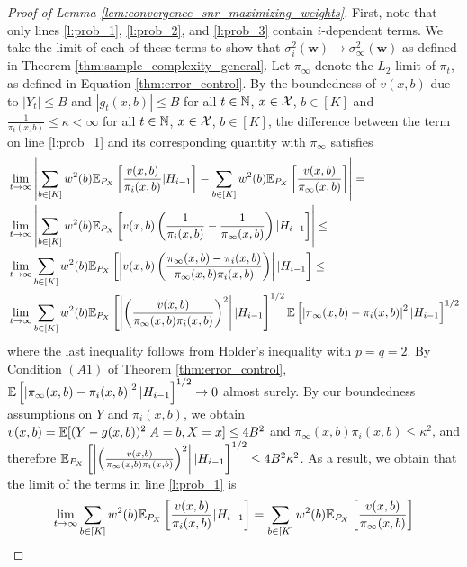 \documentclass{article}
\begin{document}
\begin{appendices}
\begin{proof}[Proof of Lemma \ref{lem:convergence_snr_maximizing_weights}]
First, note that only lines \eqref{l:prob_1}, \eqref{l:prob_2}, and \eqref{l:prob_3} contain $i$-dependent terms. We take the limit of each of these terms to show that $\sigma_i^2(\bm{w}) \rightarrow \sigma^2_\infty(\bm{w})$ as defined in Theorem \ref{thm:sample_complexity_general}. Let $\pi_\infty$ denote the $L_2$ limit of $\pi_t$, as defined in Equation \ref{thm:error_control}. By the boundedness of $v(x,b)$ due to $|Y_t| \leq B$ and $|g_t(x,b)| \leq B$ for all $t \in \mathbb{N}$, $x \in \mathcal{X}$, $b \in [K]$ and $\frac{1}{\pi_t(x,b)} \leq \kappa < \infty$ for all $t \in \mathbb{N}$, $x \in \mathcal{X}$, $b \in [K]$, the difference between the term on line \eqref{l:prob_1} and its corresponding quantity with $\pi_\infty$ satisfies
\begin{align}
    &\lim_{t \rightarrow \infty}\left|\sum_{b \in [K]}w^2(b) \mathbb{E}_{P_X}\left[\frac{v(x,b)}{\pi_i(x,b)} | H_{i-1}\right] - \sum_{b \in [K]}w^2(b) \mathbb{E}_{P_X}\left[\frac{v(x,b)}{\pi_\infty(x,b)}\right] \right| = \\
    & \lim_{t \rightarrow \infty} \left|\sum_{b \in [K]}w^2(b) \mathbb{E}_{P_X}\left[v(x,b)\left(\frac{1}{\pi_i(x,b)}- \frac{1}{\pi_\infty(x,b)}\right) | H_{i-1}\right] \right| \leq  \\
    & \lim_{t \rightarrow \infty}\sum_{b \in [K]}w^2(b) \mathbb{E}_{P_X}\left[ \left|v(x,b)\left(\frac{\pi_\infty(x,b) - \pi_i(x,b)}{\pi_\infty(x,b)\pi_i(x,b)}\right)\right| | H_{i-1}\right] \leq \\
    & \lim_{t \rightarrow \infty}\sum_{b \in [K]}w^2(b) \mathbb{E}_{P_X}\left[ \left|\left(\frac{v(x,b)}{\pi_\infty(x,b)\pi_i(x,b)}\right)^2\right| | H_{i-1}\right]^{1/2}\mathbb{E}\left[\left|\pi_\infty(x,b) - \pi_i(x,b)\right|^2|H_{i-1}\right]^{1/2}
\end{align}
where the last inequality follows from Holder's inequality with $p=q=2$. 
By Condition $(A1)$ of Theorem \ref{thm:error_control}, $\mathbb{E}\left[\left|\pi_\infty(x,b) - \pi_i(x,b)\right|^2|H_{i-1}\right]^{1/2} \rightarrow 0$ almost surely. By our boundedness assumptions on $Y$ and $\pi_i(x,b)$, we obtain $v(x,b) = \mathbb{E}[ (Y - g(x,b))^2 | A=b, X=x ] \leq 4B^2$ and $\pi_\infty(x,b)\pi_i(x,b)\leq \kappa^2$, and therefore $\mathbb{E}_{P_X}\left[ \left|\left(\frac{v(x,b)}{\pi_\infty(x,b)\pi_i(x,b)}\right)^2\right| | H_{i-1}\right]^{1/2} \leq 4B^2\kappa^2$. As a result, we obtain that the limit of the terms in line \eqref{l:prob_1} is 
\begin{equation}
    \lim_{t \rightarrow \infty}\sum_{b \in [K]}w^2(b) \mathbb{E}_{P_X}\left[\frac{v(x,b)}{\pi_i(x,b)} | H_{i-1}\right] = \sum_{b \in [K]}w^2(b) \mathbb{E}_{P_X}\left[\frac{v(x,b)}{\pi_\infty(x,b)}\right]
\end{equation}


\end{proof}
\end{appendices}
\end{document}
